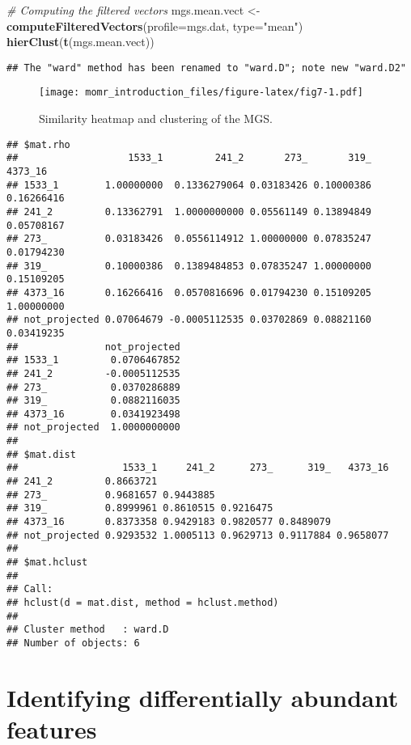 \documentclass[]{article}
\newenvironment{Shaded}{\begin{snugshade}}{\end{snugshade}}
\newcommand{\KeywordTok}[1]{\textcolor[rgb]{0.13,0.29,0.53}{\textbf{{#1}}}}
\newcommand{\DataTypeTok}[1]{\textcolor[rgb]{0.13,0.29,0.53}{{#1}}}
\newcommand{\StringTok}[1]{\textcolor[rgb]{0.31,0.60,0.02}{{#1}}}
\newcommand{\CommentTok}[1]{\textcolor[rgb]{0.56,0.35,0.01}{\textit{{#1}}}}
\newcommand{\NormalTok}[1]{{#1}}
\begin{document}
\begin{Shaded}
\begin{Highlighting}[]
\CommentTok{# Computing the filtered vectors}
\NormalTok{mgs.mean.vect <-}\StringTok{ }\KeywordTok{computeFilteredVectors}\NormalTok{(}\DataTypeTok{profile=}\NormalTok{mgs.dat, }\DataTypeTok{type=}\StringTok{"mean"}\NormalTok{)}
\KeywordTok{hierClust}\NormalTok{(}\KeywordTok{t}\NormalTok{(mgs.mean.vect))}
\end{Highlighting}
\end{Shaded}

\begin{verbatim}
## The "ward" method has been renamed to "ward.D"; note new "ward.D2"
\end{verbatim}

\begin{figure}[htbp]
\centering
\texttt{[image: momr\_introduction\_files/figure-latex/fig7-1.pdf]}
\caption{Similarity heatmap and clustering of the MGS.}
\end{figure}

\begin{verbatim}
## $mat.rho
##                   1533_1         241_2       273_       319_    4373_16
## 1533_1        1.00000000  0.1336279064 0.03183426 0.10000386 0.16266416
## 241_2         0.13362791  1.0000000000 0.05561149 0.13894849 0.05708167
## 273_          0.03183426  0.0556114912 1.00000000 0.07835247 0.01794230
## 319_          0.10000386  0.1389484853 0.07835247 1.00000000 0.15109205
## 4373_16       0.16266416  0.0570816696 0.01794230 0.15109205 1.00000000
## not_projected 0.07064679 -0.0005112535 0.03702869 0.08821160 0.03419235
##               not_projected
## 1533_1         0.0706467852
## 241_2         -0.0005112535
## 273_           0.0370286889
## 319_           0.0882116035
## 4373_16        0.0341923498
## not_projected  1.0000000000
## 
## $mat.dist
##                  1533_1     241_2      273_      319_   4373_16
## 241_2         0.8663721                                        
## 273_          0.9681657 0.9443885                              
## 319_          0.8999961 0.8610515 0.9216475                    
## 4373_16       0.8373358 0.9429183 0.9820577 0.8489079          
## not_projected 0.9293532 1.0005113 0.9629713 0.9117884 0.9658077
## 
## $mat.hclust
## 
## Call:
## hclust(d = mat.dist, method = hclust.method)
## 
## Cluster method   : ward.D 
## Number of objects: 6
\end{verbatim}

\section{Identifying differentially abundant
features}\label{identifying-differentially-abundant-features}
\end{document}
